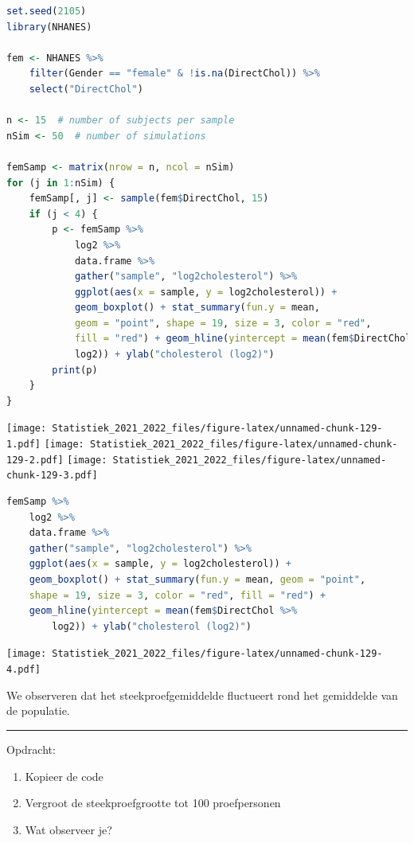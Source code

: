 \documentclass[
  12pt,dutch,coursenotes]{book}
\providecommand{\tightlist}{%
  \setlength{\itemsep}{0pt}\setlength{\parskip}{0pt}}
\theoremstyle{definition}
\theoremstyle{definition}
\theoremstyle{definition}
\theoremstyle{definition}
\theoremstyle{remark}
\begin{document}
\begin{lstlisting}[language=R]
set.seed(2105)
library(NHANES)

fem <- NHANES %>%
    filter(Gender == "female" & !is.na(DirectChol)) %>%
    select("DirectChol")

n <- 15  # number of subjects per sample
nSim <- 50  # number of simulations

femSamp <- matrix(nrow = n, ncol = nSim)
for (j in 1:nSim) {
    femSamp[, j] <- sample(fem$DirectChol, 15)
    if (j < 4) {
        p <- femSamp %>%
            log2 %>%
            data.frame %>%
            gather("sample", "log2cholesterol") %>%
            ggplot(aes(x = sample, y = log2cholesterol)) +
            geom_boxplot() + stat_summary(fun.y = mean,
            geom = "point", shape = 19, size = 3, color = "red",
            fill = "red") + geom_hline(yintercept = mean(fem$DirectChol %>%
            log2)) + ylab("cholesterol (log2)")
        print(p)
    }
}
\end{lstlisting}

\texttt{[image: Statistiek\_2021\_2022\_files/figure-latex/unnamed-chunk-129-1.pdf]} \texttt{[image: Statistiek\_2021\_2022\_files/figure-latex/unnamed-chunk-129-2.pdf]} \texttt{[image: Statistiek\_2021\_2022\_files/figure-latex/unnamed-chunk-129-3.pdf]}

\begin{lstlisting}[language=R]
femSamp %>%
    log2 %>%
    data.frame %>%
    gather("sample", "log2cholesterol") %>%
    ggplot(aes(x = sample, y = log2cholesterol)) +
    geom_boxplot() + stat_summary(fun.y = mean, geom = "point",
    shape = 19, size = 3, color = "red", fill = "red") +
    geom_hline(yintercept = mean(fem$DirectChol %>%
        log2)) + ylab("cholesterol (log2)")
\end{lstlisting}

\texttt{[image: Statistiek\_2021\_2022\_files/figure-latex/unnamed-chunk-129-4.pdf]}

We observeren dat het steekproefgemiddelde fluctueert rond het gemiddelde van de populatie.

\begin{center}\rule{0.5\linewidth}{0.5pt}\end{center}

Opdracht:

\begin{enumerate}
\def\labelenumi{\arabic{enumi}.}
\tightlist
\item
  Kopieer de code
\item
  Vergroot de steekproefgrootte tot 100 proefpersonen
\item
  Wat observeer je?
\end{enumerate}
\end{document}
